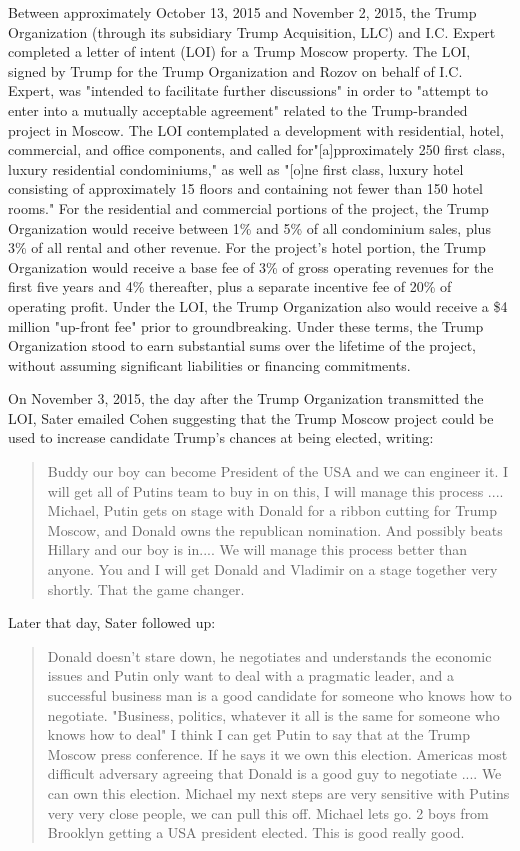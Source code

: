Between approximately October 13, 2015 and November 2, 2015, the Trump Organization (through its subsidiary Trump Acquisition, LLC) and I.C. Expert completed a letter of intent (LOI) for a Trump Moscow property.
The LOI, signed by Trump for the Trump Organization and Rozov on behalf of I.C. Expert, was "intended to facilitate further discussions" in order to "attempt to enter into a mutually acceptable agreement" related to the Trump-branded project in Moscow.
The LOI contemplated a development with residential, hotel, commercial, and office components, and called for"[a]pproximately 250 first class, luxury residential condominiums," as well as "[o]ne first class, luxury hotel consisting of approximately 15 floors and containing not fewer than 150 hotel rooms."
For the residential and commercial portions of the project, the Trump Organization would receive between 1\% and 5\% of all condominium sales, plus 3\% of all rental and other revenue.
For the project's hotel portion, the Trump Organization would receive a base fee of 3\% of gross operating revenues for the first five years and 4\% thereafter, plus a separate incentive fee of 20\% of operating profit.
Under the LOI, the Trump Organization also would receive a \$4 million "up-front fee" prior to groundbreaking.
Under these terms, the Trump Organization stood to earn substantial sums over the lifetime of the project, without assuming significant liabilities or financing commitments.

On November 3, 2015, the day after the Trump Organization transmitted the LOI, Sater emailed Cohen suggesting that the Trump Moscow project could be used to increase candidate Trump's chances at being elected, writing:

\begin{quote}
Buddy our boy can become President of the USA and we can engineer it.
I will get all of Putins team to buy in on this, I will manage this process ....
Michael, Putin gets on stage with Donald for a ribbon cutting for Trump Moscow, and Donald owns the republican nomination.
And possibly beats Hillary and our boy is in....
We will manage this process better than anyone.
You and I will get Donald and Vladimir on a stage together very shortly.
That the game changer.
\end{quote}

Later that day, Sater followed up:

\begin{quote}
Donald doesn't stare down, he negotiates and understands the economic issues and Putin only want to deal with a pragmatic leader, and a successful business man is a good candidate for someone who knows how to negotiate.
"Business, politics, whatever it all is the same for someone who knows how to deal"
I think I can get Putin to say that at the Trump Moscow press conference.
If he says it we own this election.
Americas most difficult adversary agreeing that Donald is a good guy to negotiate ....
We can own this election.
Michael my next steps are very sensitive with Putins very very close people, we can pull this off.
Michael lets go.
2 boys from Brooklyn getting a USA president elected.
This is good really good.
\end{quote}

